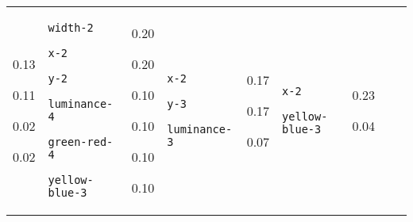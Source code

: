 {\begin{tabular}{@{}p{1.2cm}|p{2.75cm}@{}p{0.8cm}@{}|p{2.75cm}@{}p{0.8cm}@{}|p{2.75cm}@{}p{0.8cm}@{}|p{2.75cm}@{}p{0.8cm}@{}}
0.13

0.11

0.02

0.02 & \texttt{width-2}

\texttt{x-2}

\texttt{y-2}

\texttt{luminance-4}

\texttt{green-red-4}

\texttt{yellow-blue-3} & 0.20

0.20

0.10

0.10

0.10

0.10 & \texttt{x-2}

\texttt{y-3}

\texttt{luminance-3} & 0.17

0.17

0.07 & \texttt{x-2}

\texttt{yellow-blue-3} & 0.23

0.04
\end{tabular}}
